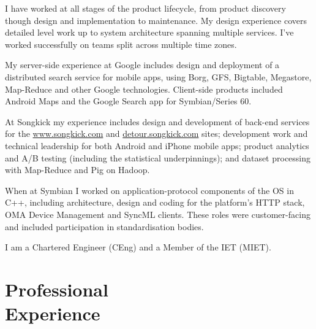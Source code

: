 \documentclass[margin = 0cm,line]{resume}
\begin{document}
\begin{resume}
    I have worked at all stages of the product lifecycle, from product discovery though design and implementation to
    maintenance. My design experience covers detailed level work up to system architecture spanning multiple services.
    I've worked successfully on teams split across multiple time zones.

    My server-side experience at Google includes design and deployment of a distributed search service for mobile apps,
    using Borg, GFS, Bigtable, Megastore, Map-Reduce and other Google technologies.  Client-side products included
    Android Maps and the Google Search app for Symbian/Series 60.

    At Songkick my experience includes design and development of back-end services for the \url{www.songkick.com} and
    \url{detour.songkick.com} sites; development work and technical leadership for both Android and iPhone mobile apps;
    product analytics and A/B testing (including the statistical underpinnings); and dataset processing with Map-Reduce
    and Pig on Hadoop.

    When at Symbian I worked on application-protocol components of the OS in C++, including architecture, design and
    coding for the platform's HTTP stack, OMA Device Management and SyncML clients.  These roles were customer-facing
    and included participation in standardisation bodies.

    I am a Chartered Engineer (CEng) and a Member of the IET (MIET).


    \section{\mysidestyle Professional\\Experience}


\end{resume}
\end{document}
